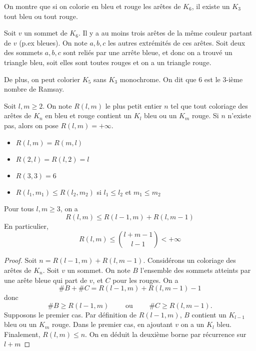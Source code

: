 \begin{rem}
On montre que si on colorie en bleu et rouge les arêtes de $K_6$, il existe un $K_3$ tout bleu ou tout rouge.

Soit  $v$ un sommet de  $K_6$. Il y a au moins trois arêtes de la même couleur partant de  $v$ (p.ex bleues). On note  $a,b,c$ les autres extrémités de ces arêtes. Soit deux des sommets  $a,b,c$ sont reliés par une arrête bleue, et donc on a trouvé un triangle bleu, soit elles sont toutes rouges et on a un triangle rouge. 

De plus, on peut colorier $K_5$ sans  $K_3$ monochrome. %
On dit que  $6$ est le  $3$-ième nombre de Ramsay.
\end{rem}

\begin{dfn}
    Soit $l,m\geq 2$. On note $R(l,m)$ le plus petit  entier  $n$ tel que tout coloriage des arêtes de  $K_n$ en bleu et rouge contient un  $K_l$ bleu ou un  $K_m$ rouge. Si $n$ n'existe pas, alors on pose  $R(l,m)=+\infty$.
\end{dfn}

\begin{rem}
     \begin{itemize}
         \item $R(l,m)=R(m,l)$
         \item  $R(2, l)=R(l, 2)=l$
         \item  $R(3, 3)=6$ 
         \item $R(l_1, m_1)\leq R(l_2,m_2)$ si $l_1\leq l_2$ et $m_1\leq m_2$
    \end{itemize}
\end{rem}

\begin{thm}
    Pour tous $l,m\geq 3$, on a \[R(l,m)\leq R(l-1,m)+R(l,m-1)\]
    En particulier, \[R(l,m)\leq \binom{l+m-1}{l-1}<+\infty\]
\end{thm}

\begin{proof}
    Soit $n=R(l-1, m)+R(l,m-1)$. Considérons un coloriage des arêtes de  $K_n$. Soit  $v$ un sommet. On note  $B$ l'ensemble des sommets atteints par une arête bleue qui part de  $v$, et  $C$ pour les rouges. On a \[\#B+\#C=R(l-1, m)+R(l,m-1)-1\] donc \[\#B\geq R(l-1, m) \qquad \text{ ou }\qquad  \#C\geq R(l,m-1).\] Supposons le premier cas.
    Par définition de $R(l-1, m)$, $B$ contient un  $K_{l-1}$ bleu ou un $K_m$ rouge. Dans le premier cas, en ajoutant  $v$ on a un  $K_l$ bleu. Finalement,  $R(l,m)\leq n$. On en déduit la deuxième borne par récurrence sur $l+m$
\end{proof}

